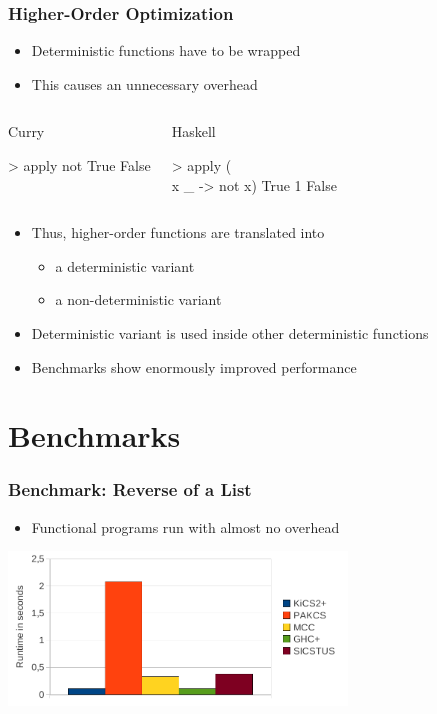 \documentclass[utf8]{beamer}
\newenvironment{program}{\begin{semiverbatim}\small}{\end{semiverbatim}}
\begin{document}
\begin{frame}[fragile]
\frametitle{Higher-Order Optimization}

\begin{itemize}
\item Deterministic functions have to be wrapped
\item This causes an unnecessary overhead
\end{itemize}

\begin{columns}[t]
\begin{block}{Curry}
\begin{program}
> apply not True
False
\end{program}
\end{block}
\begin{block}{Haskell}
\begin{program}
> apply (\\x _ -> not x) True 1
False
\end{program}
\end{block}
\end{columns}
\vspace{3ex}
\begin{itemize}
\item Thus, higher-order functions are translated into
  \begin{itemize}
   \item a deterministic variant
   \item a non-deterministic variant
  \end{itemize}
\item Deterministic variant is used inside other deterministic functions
\item Benchmarks show enormously improved performance
\end{itemize}
\end{frame}


\section{Benchmarks}

\begin{frame}
\frametitle{Benchmark: Reverse of a List}
\begin{itemize}
\item Functional programs run with almost no overhead
\end{itemize}
\begin{center}
\includegraphics[width=9cm]{gfx/reverse}
\end{center}
\end{frame}
\end{document}
